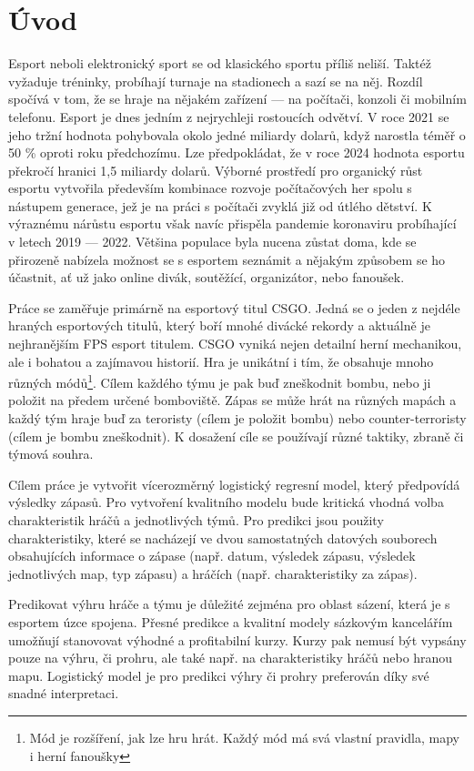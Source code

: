 \chapter{Úvod}
Esport neboli elektronický sport se od klasického sportu příliš neliší. Taktéž vyžaduje tréninky, probíhají turnaje na stadionech a sazí se na něj. Rozdíl spočívá v tom, že
se hraje na nějakém zařízení --- na počítači, konzoli či mobilním telefonu. Esport je dnes jedním z nejrychleji rostoucích odvětví. V roce 2021 se jeho tržní hodnota pohybovala
okolo jedné miliardy dolarů, když narostla téměř o 50 \% oproti roku předchozímu. Lze předpokládat, že v roce 2024 hodnota esportu překročí hranici 1,5 miliardy dolarů. Výborné
prostředí pro organický růst esportu vytvořila především kombinace rozvoje počítačových her spolu s nástupem generace, jež je na práci s počítači zvyklá již od útlého dětství.
K výraznému nárůstu esportu však navíc přispěla pandemie koronaviru probíhající v letech 2019 --- 2022. Většina populace byla nucena zůstat doma, kde se přirozeně nabízela možnost
se s esportem seznámit a nějakým způsobem se ho účastnit, ať už jako online divák, soutěžící, organizátor, nebo fanoušek.

Práce se zaměřuje primárně na esportový titul \acf{CSGO}. Jedná se o jeden z nejdéle hraných esportových titulů, který boří mnohé divácké rekordy a aktuálně je nejhranějším
\ac{FPS} esport titulem. \ac{CSGO} vyniká nejen detailní herní mechanikou, ale i bohatou a zajímavou historií. Hra je unikátní i tím, že obsahuje mnoho různých
módů\footnote{Mód je rozšíření, jak lze hru hrát. Každý mód má svá vlastní pravidla, mapy i herní fanoušky}. Cílem každého týmu je pak buď zneškodnit bombu, nebo ji položit na
předem určené bomboviště. Zápas se může hrát na různých mapách a každý tým hraje buď za teroristy (cílem je položit bombu) nebo counter-terroristy (cílem je bombu zneškodnit).
K dosažení cíle se používají různé taktiky, zbraně či týmová souhra.

Cílem práce je vytvořit vícerozměrný logistický regresní model, který předpovídá výsledky zápasů. Pro vytvoření kvalitního modelu bude kritická vhodná volba
charakteristik hráčů a jednotlivých týmů. Pro predikci jsou použity charakteristiky, které se nacházejí ve dvou samostatných datových
souborech obsahujících informace o zápase (např. datum, výsledek zápasu, výsledek jednotlivých map, typ zápasu) a hráčích (např. charakteristiky za zápas). 

Predikovat výhru hráče a týmu je důležité zejména pro oblast sázení, která je s esportem úzce spojena. Přesné predikce a kvalitní modely sázkovým kancelářím umožňují
stanovovat výhodné a profitabilní kurzy. Kurzy pak nemusí být vypsány pouze na výhru, či prohru, ale také např. na charakteristiky hráčů nebo hranou mapu. Logistický model je pro
predikci výhry či prohry preferován díky své snadné interpretaci.

